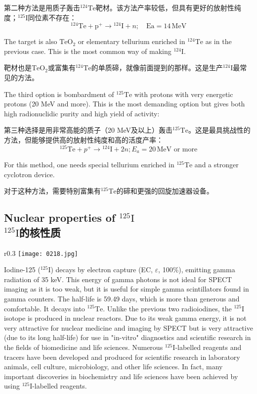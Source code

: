 \documentclass[dvipsnames, svgnames,a4paper,11pt]{article}
\begin{document}
第二种方法是用质子轰击\(\mathrm{^{124}Te}\)靶材。该方法产率较低，但具有更好的放射性纯度；\(\mathrm{^{125}I}\)同位素不存在：  
\[
\mathrm{^{124}Te} + \mathrm{p}^+ \rightarrow \mathrm{^{124}I} + n; \quad \text{Ea} = 14 \, \text{MeV}
\]

The target is also \(\mathrm{TeO_2}\) or elementary tellurium enriched in \(\mathrm{^{124}Te}\) as in the previous case. This is the most common way of making \(\mathrm{^{124}I}\).  

靶材也是\(\mathrm{TeO_2}\)或富集有\(\mathrm{^{124}Te}\)的单质碲，就像前面提到的那样。这是生产\(\mathrm{^{124}I}\)最常见的方法。  

The third option is bombardment of \(\mathrm{^{125}Te}\) with protons with very energetic protons (20 MeV and more). This is the most demanding option but gives both high radionuclidic purity and high yield of activity:  

第三种选择是用非常高能的质子（20 MeV及以上）轰击\(\mathrm{^{125}Te}\)。这是最具挑战性的方法，但能够提供高的放射性纯度和高的活度产率：  
\[
\mathrm{^{125}Te} + p^+ \rightarrow \mathrm{^{124}I} + 2n; E_a = 20 \, \text{MeV or more}
\]

For this method, one needs special tellurium enriched in \(\mathrm{^{125}Te}\) and a stronger cyclotron device.

对于这种方法，需要特别富集有\(\mathrm{^{125}Te}\)的碲和更强的回旋加速器设备。

\subsection{Nuclear properties of \(\mathrm{^{125}I}\)\\ \(\mathrm{^{125}I}\)的核性质}

\begin{wrapfigure}{r}{0.3\textwidth}
    \centering
    \texttt{[image: 0218.jpg]}
     \label{fig272}
\end{wrapfigure}

Iodine-125 (\(\mathrm{^{125}I}\)) decays by electron capture (EC, \(\varepsilon\), 100\%), emitting gamma radiation of 35 keV. This energy of gamma photons is not ideal for SPECT imaging as it is too weak, but it is useful for simple gamma scintillators found in gamma counters. The half-life is 59.49 days, which is more than generous and comfortable. It decays into \(\mathrm{^{125}Te}\). Unlike the previous two radioiodines, the \(\mathrm{^{125}I}\) isotope is produced in nuclear reactors. Due to its weak gamma energy, it is not very attractive for nuclear medicine and imaging by SPECT but is very attractive (due to its long half-life) for use in "in-vitro" diagnostics and scientific research in the fields of biomedicine and life sciences. Numerous \(\mathrm{^{125}I}\)-labelled reagents and tracers have been developed and produced for scientific research in laboratory animals, cell culture, microbiology, and other life sciences. In fact, many important discoveries in biochemistry and life sciences have been achieved by using \(\mathrm{^{125}I}\)-labelled reagents.
\end{document}
